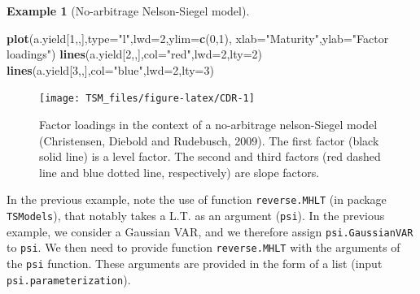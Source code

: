 \documentclass[
  12pt,
]{book}
\newenvironment{Shaded}{\begin{snugshade}}{\end{snugshade}}
\newcommand{\AttributeTok}[1]{\textcolor[rgb]{0.13,0.29,0.53}{#1}}
\newcommand{\DecValTok}[1]{\textcolor[rgb]{0.00,0.00,0.81}{#1}}
\newcommand{\FunctionTok}[1]{\textcolor[rgb]{0.13,0.29,0.53}{\textbf{#1}}}
\newcommand{\NormalTok}[1]{#1}
\newcommand{\StringTok}[1]{\textcolor[rgb]{0.31,0.60,0.02}{#1}}
\theoremstyle{definition}
\theoremstyle{definition}
\newtheorem{example}{Example}[chapter]
\theoremstyle{definition}
\theoremstyle{definition}
\theoremstyle{remark}
\begin{document}
\begin{example}[No-arbitrage Nelson-Siegel model]
\begin{Shaded}
\begin{Highlighting}[]
\FunctionTok{plot}\NormalTok{(a.yield[}\DecValTok{1}\NormalTok{,,],}\AttributeTok{type=}\StringTok{"l"}\NormalTok{,}\AttributeTok{lwd=}\DecValTok{2}\NormalTok{,}\AttributeTok{ylim=}\FunctionTok{c}\NormalTok{(}\DecValTok{0}\NormalTok{,}\DecValTok{1}\NormalTok{),}
     \AttributeTok{xlab=}\StringTok{"Maturity"}\NormalTok{,}\AttributeTok{ylab=}\StringTok{"Factor loadings"}\NormalTok{)}
\FunctionTok{lines}\NormalTok{(a.yield[}\DecValTok{2}\NormalTok{,,],}\AttributeTok{col=}\StringTok{"red"}\NormalTok{,}\AttributeTok{lwd=}\DecValTok{2}\NormalTok{,}\AttributeTok{lty=}\DecValTok{2}\NormalTok{)}
\FunctionTok{lines}\NormalTok{(a.yield[}\DecValTok{3}\NormalTok{,,],}\AttributeTok{col=}\StringTok{"blue"}\NormalTok{,}\AttributeTok{lwd=}\DecValTok{2}\NormalTok{,}\AttributeTok{lty=}\DecValTok{3}\NormalTok{)}
\end{Highlighting}
\end{Shaded}

\begin{figure}
\texttt{[image: TSM\_files/figure-latex/CDR-1]} \caption{Factor loadings in the context of a no-arbitrage nelson-Siegel model (Christensen, Diebold and Rudebusch, 2009). The first factor (black solid line) is a level factor. The second and third factors (red dashed line and blue dotted line, respectively) are slope factors.}\label{fig:CDR}
\end{figure}

\end{example}

In the previous example, note the use of function \texttt{reverse.MHLT} (in package \texttt{TSModels}), that notably takes a L.T. as an argument (\texttt{psi}). In the previous example, we consider a Gaussian VAR, and we therefore assign \texttt{psi.GaussianVAR} to \texttt{psi}. We then need to provide function \texttt{reverse.MHLT} with the arguments of the \texttt{psi} function. These arguments are provided in the form of a list (input \texttt{psi.parameterization}).
\end{document}

